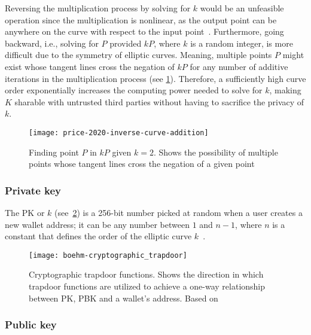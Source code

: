 Reversing the multiplication process by solving for $k$ would be an unfeasible operation since the multiplication is nonlinear, as the output point can be anywhere on the curve with respect to the input point~\autocite{price_bitcoins_2020}.
Furthermore, going backward, i.e., solving for $P$ provided $kP$, where $k$ is a random integer, is more difficult due to the symmetry of elliptic curves.
Meaning, multiple points $P$ might exist whose tangent lines cross the negation of $kP$ for any number of additive iterations in the multiplication process (see \cref{fig:finding-point-p}).
Therefore, a sufficiently high curve order exponentially increases the computing power needed to solve for $k$, making $K$ sharable with untrusted third parties without having to sacrifice the privacy of $k$.

\begin{figure}[H]
    \begin{center}
        \texttt{[image: price-2020-inverse-curve-addition]}
    \end{center}
    \caption[Finding point $P$ in $kP$ given $k=2$]{Finding point $P$ in $kP$ given $k=2$.
    Shows the possibility of multiple points whose tangent lines cross the negation of a given point~\autocite{price_bitcoins_2020}}
    \label{fig:finding-point-p}
\end{figure}

\subsubsection{Private key}\label{subsubsec:private-key}

The \gls{PK} or $k$ (see~\cref{fig:elliptic-curve-trapdoor}) is a 256-bit number picked at random when a user creates a new wallet address;
it can be any number between $1$ and $n-1$, where $n$ is a constant that defines the order of the elliptic curve $k$~\autocite[63]{antonopoulos_mastering_2017}.

\begin{figure}[H]
    \texttt{[image: boehm-cryptographic\_trapdoor]}
    \caption[Cryptographic trapdoor functions]{Cryptographic trapdoor functions. Shows the direction in which trapdoor functions are utilized to achieve a one-way relationship between \gls{PK}, \gls{PBK} and a wallet's address. Based on~\textcite[160]{antonopoulos_mastering_2017}}
    \label{fig:elliptic-curve-trapdoor}
\end{figure}

\subsubsection{Public key}\label{subsubsec:public-key}

